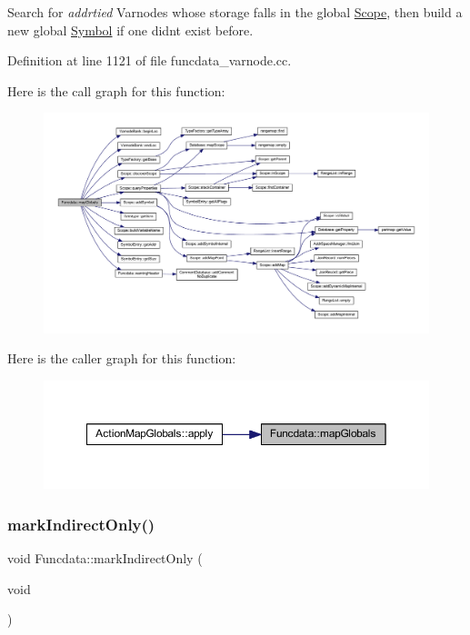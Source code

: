 Search for {\itshape addrtied} Varnodes whose storage falls in the global \mbox{\hyperlink{class_scope}{Scope}}, then build a new global \mbox{\hyperlink{class_symbol}{Symbol}} if one didn\textquotesingle{}t exist before. 

Definition at line 1121 of file funcdata\+\_\+varnode.\+cc.

Here is the call graph for this function\+:
\nopagebreak
\begin{figure}[H]
\begin{center}
\leavevmode
\includegraphics[width=350pt]{class_funcdata_aed6aefa7321e887e3b759de94e4d3d4f_cgraph}
\end{center}
\end{figure}
Here is the caller graph for this function\+:
\nopagebreak
\begin{figure}[H]
\begin{center}
\leavevmode
\includegraphics[width=350pt]{class_funcdata_aed6aefa7321e887e3b759de94e4d3d4f_icgraph}
\end{center}
\end{figure}
\mbox{\label{class_funcdata_a41dc1e061256c4cc55e7afcf5995f435}} 
\subsubsection{\texorpdfstring{markIndirectOnly()}{markIndirectOnly()}}
{\footnotesize\ttfamily void Funcdata\+::mark\+Indirect\+Only (\begin{DoxyParamCaption}\item[{void}]{ }\end{DoxyParamCaption})}



